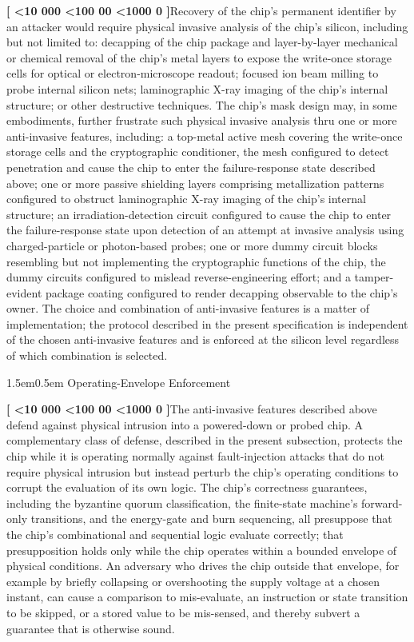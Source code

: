 \documentclass[12pt,letterpaper]{article}
\makeatletter
\newcounter{para}
\newcommand{\padzero}{%
  \ifnum\value{para}<10 000\else%
  \ifnum\value{para}<100 00\else%
  \ifnum\value{para}<1000 0\else%
  \fi\fi\fi}
\newcommand{\para}{%
  \refstepcounter{para}\noindent\textbf{[\padzero\arabic{para}]}\hspace{0.5em}\ignorespaces}
\newcounter{fig}
\renewcommand{\subsection}{\@startsection{subsection}{2}{0pt}%
  {1.5em}{0.5em}%
  {\normalfont\normalsize\bfseries}}
\makeatother
\begin{document}
\para Recovery of the chip's permanent identifier by an attacker would require physical invasive analysis of the chip's silicon, including but not limited to: decapping of the chip package and layer-by-layer mechanical or chemical removal of the chip's metal layers to expose the write-once storage cells for optical or electron-microscope readout; focused ion beam milling to probe internal silicon nets; laminographic X-ray imaging of the chip's internal structure; or other destructive techniques. The chip's mask design may, in some embodiments, further frustrate such physical invasive analysis thru one or more anti-invasive features, including: a top-metal active mesh covering the write-once storage cells and the cryptographic conditioner, the mesh configured to detect penetration and cause the chip to enter the failure-response state described above; one or more passive shielding layers comprising metallization patterns configured to obstruct laminographic X-ray imaging of the chip's internal structure; an irradiation-detection circuit configured to cause the chip to enter the failure-response state upon detection of an attempt at invasive analysis using charged-particle or photon-based probes; one or more dummy circuit blocks resembling but not implementing the cryptographic functions of the chip, the dummy circuits configured to mislead reverse-engineering effort; and a tamper-evident package coating configured to render decapping observable to the chip's owner. The choice and combination of anti-invasive features is a matter of implementation; the protocol described in the present specification is independent of the chosen anti-invasive features and is enforced at the silicon level regardless of which combination is selected.

\subsection{Operating-Envelope Enforcement}

\para The anti-invasive features described above defend against physical intrusion into a powered-down or probed chip. A complementary class of defense, described in the present subsection, protects the chip while it is operating normally against fault-injection attacks that do not require physical intrusion but instead perturb the chip's operating conditions to corrupt the evaluation of its own logic. The chip's correctness guarantees, including the byzantine quorum classification, the finite-state machine's forward-only transitions, and the energy-gate and burn sequencing, all presuppose that the chip's combinational and sequential logic evaluate correctly; that presupposition holds only while the chip operates within a bounded envelope of physical conditions. An adversary who drives the chip outside that envelope, for example by briefly collapsing or overshooting the supply voltage at a chosen instant, can cause a comparison to mis-evaluate, an instruction or state transition to be skipped, or a stored value to be mis-sensed, and thereby subvert a guarantee that is otherwise sound.
\end{document}
